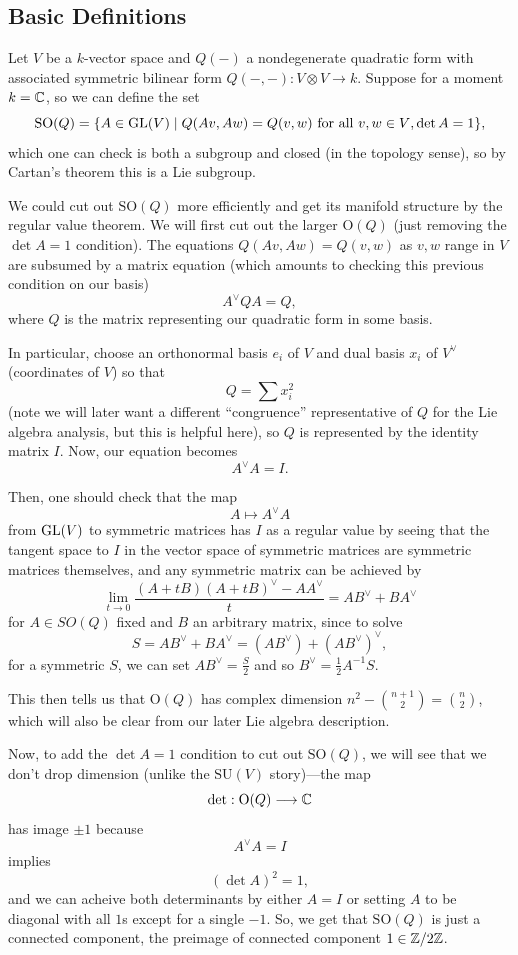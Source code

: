 \documentclass[12pt]{article}
\newcommand{\SO}{\mathrm{SO}}
\begin{document}
\subsection{Basic Definitions}
Let $V$ be a $k$-vector space and $Q(-)$ a nondegenerate quadratic form with associated symmetric bilinear form $Q(-,-): V\otimes V\to k$. Suppose for a moment $k=\mathbb{C}$, so we can define the set
\[ \SO(Q) = \{A\in \GL(V) \mid Q(Av,Aw) = Q(v,w) \text{ for all $v,w\in V$}, \det A = 1\}, \]
which one can check is both a subgroup and closed (in the topology sense), so by Cartan's theorem this is a Lie subgroup.

\begin{rmk}
    We could cut out $\SO(Q)$ more efficiently and get its manifold structure by the regular value theorem. We will first cut out the larger $\mathrm{O}(Q)$ (just removing the $\det A=1$ condition). The equations $Q(Av,Aw)=Q(v,w)$ as $v,w$ range in $V$ are subsumed by a matrix equation (which amounts to checking this previous condition on our basis)
    \[A^\vee Q A = Q,\]
    where $Q$ is the matrix representing our quadratic form in some basis.

    In particular, choose an orthonormal basis $e_i$ of $V$ and dual basis $x_i$ of $V^\vee$ (coordinates of $V$) so that
    \[Q = \sum x_i^2\]
    (note we will later want a different ``congruence'' representative of $Q$ for the Lie algebra analysis, but this is helpful here), so $Q$ is represented by the identity matrix $I$. Now, our equation becomes
    \[A^\vee A = I.\]

    Then, one should check that the map
    \[A \mapsto A^\vee A\]
    from $\mathrm{GL}(V)$ to symmetric matrices has $I$ as a regular value by seeing that the tangent space to $I$ in the vector space of symmetric matrices are symmetric matrices themselves, and any symmetric matrix can be achieved by
    \[\lim_{t\to 0} \frac{(A+tB)(A+tB)^\vee - AA^\vee}{t} = AB^\vee + BA^\vee\]
    for $A\in SO(Q)$ fixed and $B$ an arbitrary matrix, since to solve
    \[S = AB^\vee + BA^\vee = (AB^\vee) + (AB^\vee)^\vee,\]
    for a symmetric $S$, we can set $AB^\vee = \frac{S}{2}$ and so $B^\vee = \frac{1}{2} A^{-1} S$.

    This then tells us that $\mathrm{O}(Q)$ has complex dimension $n^2 - \binom{n+1}{2} = \binom{n}{2}$, which will also be clear from our later Lie algebra description.

    Now, to add the $\det A=1$ condition to cut out $\SO(Q)$, we will see that we don't drop dimension (unlike the $\mathrm{SU}(V)$ story)---the map
    \[\det: \mathrm{O}(Q) \longrightarrow \mathbb{C}\]
    has image $\pm 1$ because
    \[A^\vee A = I\]
    implies
    \[(\det A)^2 = 1,\]
    and we can acheive both determinants by either $A=I$ or setting $A$ to be diagonal with all $1$s except for a single $-1$. So, we get that $\SO(Q)$ is just a connected component, the preimage of connected component $1\in \mathbb{Z}/2\mathbb{Z}$.
\end{rmk}
\end{document}
